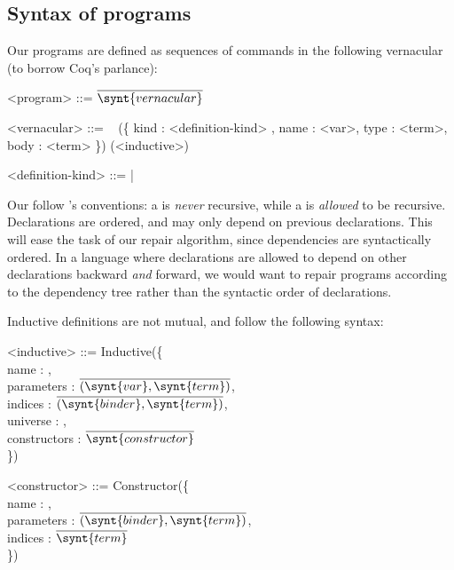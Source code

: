 \subsection{Syntax of \Chick{} programs}\label{chick-syntax-programs}

Our programs are defined as sequences of commands in the following vernacular
(to borrow Coq's parlance):

\begin{grammar}
<program> ::= $\overline{ \synt{vernacular} }$

<vernacular> ::= \ %
\alt {}(\{ kind : <definition-kind> , name : <var>, type : <term>, body : <term> \})
\alt {}(<inductive>)

<definition-kind> ::=  | 
\end{grammar}

Our  follow \Coq{}'s \Vernacular{} conventions: a
 is \emph{never} recursive, while a 
is \emph{allowed} to be recursive.  Declarations are ordered, and may only
depend on previous declarations.  This will ease the task of our repair
algorithm, since dependencies are syntactically ordered.  In a language where
declarations are allowed to depend on other declarations backward \emph{and}
forward, we would want to repair programs according to the dependency tree
rather than the syntactic order of declarations.

Inductive definitions are not mutual, and follow the following syntax:

\noindent
\begin{grammar}
<inductive> ::= Inductive(\{\\
name : ,\\
parameters : $\overline{ ( \synt{var} , \synt{term} ) }$,\\
indices : $\overline{ ( \synt{binder} , \synt{term} ) }$,\\
universe : ,\\
constructors : $\overline{ \synt{constructor} }$\\
\})

<constructor> ::= Constructor(\{\\
name : ,\\
parameters : $\overline{ ( \synt{binder}, \synt{term} ) }$,\\
indices : $\overline{ \synt{term} }$\\
\})
\end{grammar}

